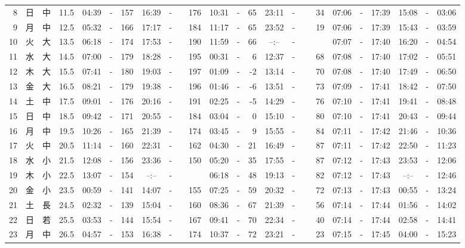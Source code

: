 \documentclass[12pt,a4j]{jsarticle}
\begin{document}
\begin{table}[htbp]
\begin{center}
{\begin{tabular}{|rc|cr|ccrccr|ccrccr|ccc|ccc|}
 8 & 日 & 中 & 11.5 &  04:39 &-& 157 &  16:39 &-& 176 &  10:31 &-&  65 &  23:11 &-&  34 & 07:06 & -& 17:39 & 15:08 & -& 03:06 \\
 9 & 月 & 中 & 12.5 &  05:32 &-& 166 &  17:17 &-& 184 &  11:17 &-&  65 &  23:52 &-&  19 & 07:06 & -& 17:39 & 15:43 & -& 03:59 \\
10 & 火 & 大 & 13.5 &  06:18 &-& 174 &  17:53 &-& 190 &  11:59 &-&  66 &  --:-- &-&~~~~~ & 07:07 & -& 17:40 & 16:20 & -& 04:54 \\
11 & 水 & 大 & 14.5 &  07:00 &-& 179 &  18:28 &-& 195 &  00:31 &-&   6 &  12:37 &-&  68 & 07:08 & -& 17:40 & 17:02 & -& 05:51 \\
12 & 木 & 大 & 15.5 &  07:41 &-& 180 &  19:03 &-& 197 &  01:09 &-&  -2 &  13:14 &-&  70 & 07:08 & -& 17:40 & 17:49 & -& 06:50 \\
13 & 金 & 大 & 16.5 &  08:21 &-& 179 &  19:38 &-& 196 &  01:46 &-&  -6 &  13:51 &-&  73 & 07:09 & -& 17:41 & 18:42 & -& 07:50 \\
14 & 土 & 中 & 17.5 &  09:01 &-& 176 &  20:16 &-& 191 &  02:25 &-&  -5 &  14:29 &-&  76 & 07:10 & -& 17:41 & 19:41 & -& 08:48 \\
15 & 日 & 中 & 18.5 &  09:42 &-& 171 &  20:55 &-& 184 &  03:04 &-&   0 &  15:10 &-&  80 & 07:10 & -& 17:41 & 20:43 & -& 09:44 \\
16 & 月 & 中 & 19.5 &  10:26 &-& 165 &  21:39 &-& 174 &  03:45 &-&   9 &  15:55 &-&  84 & 07:11 & -& 17:42 & 21:46 & -& 10:36 \\
17 & 火 & 中 & 20.5 &  11:14 &-& 160 &  22:31 &-& 162 &  04:30 &-&  21 &  16:49 &-&  87 & 07:11 & -& 17:42 & 22:50 & -& 11:23 \\
18 & 水 & 小 & 21.5 &  12:08 &-& 156 &  23:36 &-& 150 &  05:20 &-&  35 &  17:55 &-&  87 & 07:12 & -& 17:43 & 23:53 & -& 12:06 \\
19 & 木 & 小 & 22.5 &  13:07 &-& 154 &  --:-- &-&~~~~~ &  06:18 &-&  48 &  19:13 &-&  82 & 07:12 & -& 17:43 & --:-- & -& 12:46 \\
20 & 金 & 小 & 23.5 &  00:59 &-& 141 &  14:07 &-& 155 &  07:25 &-&  59 &  20:32 &-&  72 & 07:13 & -& 17:43 & 00:55 & -& 13:24 \\
21 & 土 & 長 & 24.5 &  02:32 &-& 139 &  15:04 &-& 160 &  08:36 &-&  67 &  21:39 &-&  56 & 07:14 & -& 17:44 & 01:56 & -& 14:02 \\
22 & 日 & 若 & 25.5 &  03:53 &-& 144 &  15:54 &-& 167 &  09:41 &-&  70 &  22:34 &-&  40 & 07:14 & -& 17:44 & 02:58 & -& 14:41 \\
23 & 月 & 中 & 26.5 &  04:57 &-& 153 &  16:38 &-& 174 &  10:37 &-&  72 &  23:21 &-&  23 & 07:15 & -& 17:45 & 04:00 & -& 15:23 \\

\end{tabular}}
\end{center}
\end{table}
\end{document}
